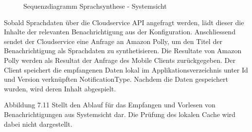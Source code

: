 \begin{figure}[h]
    \centering
    \begin{minipage}[b]{0.9\textwidth}
        \caption{Sequenzdiagramm Sprachsynthese - Systemsicht}
    \end{minipage}
\end{figure}

Sobald Sprachdaten über die Cloudservice API angefragt werden, lädt dieser die Inhalte der relevanten Benachrichtigung aus der Konfiguration.
Anschliessend sendet der Cloudservice eine Anfrage an Amazon Polly, um den Titel der Benachrichtigung als Sprachdaten zu synthetisieren.
Die Resultate von Amazon Polly werden als Resultat der Anfrage des Mobile Clients zurückgegeben.
Der Client speichert die empfangenen Daten lokal im Applikationsverzeichnis unter Id und Version verknüpften NotificationType.
Nachdem die Daten gespeichert wurden, wird deren Inhalt abgespielt.

Abbildung 7.11 Stellt den Ablauf für das Empfangen und Vorlesen von Benachrichtigungen aus Systemsicht dar.
Die Prüfung des lokalen Cache wird dabei nicht dargestellt.

\clearpage
